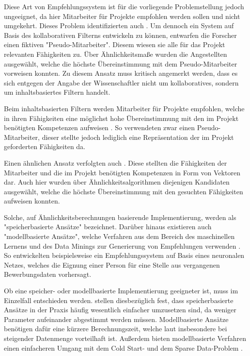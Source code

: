 \newpage
Diese Art von Empfehlungssystem ist für die vorliegende Problemstellung jedoch ungeeignet, da hier Mitarbeiter für Projekte empfohlen werden sollen und nicht umgekehrt. Dieses Problem identifizierten auch \textcite[S. 2]{mitre:2014}. Um dennoch ein System auf Basis des kollaborativen Filterns entwickeln zu können, entwarfen die Forscher einen fiktiven "Pseudo-Mitarbeiter". Diesem wiesen sie alle für das Projekt relevanten Fähigkeiten zu. Über Ähnlichkeitsmaße wurden die Angestellten ausgewählt, welche die höchste Übereinstimmung mit dem Pseudo-Mitarbeiter vorweisen konnten. Zu diesem Ansatz muss kritisch angemerkt werden, dass es sich entgegen der Angabe der Wissenschaftler nicht um kollaboratives, sondern um inhaltsbasiertes Filtern handelt.

Beim inhaltsbasierten Filtern werden Mitarbeiter für Projekte empfohlen, welche in ihren Fähigkeiten eine möglichst hohe Übereinstimmung mit den im Projekt benötigten Kompetenzen aufweisen \cite[S. 139]{recommenderSystems:2016}. So verwendeten \textcite[S. 2]{mitre:2014} zwar einen Pseudo-Mitarbeiter, dieser stellte jedoch lediglich eine Repräsentation der im Projekt geforderten Fähigkeiten da.

Einen ähnlichen Ansatz verfolgten auch \textcite[S. 6ff.]{buildingVectorRepresentations:2020}. Diese stellten die Fähigkeiten der Mitarbeiter und die im Projekt benötigten Kompetenzen in Form von Vektoren dar. Auch hier wurden über Ähnlichkeitsalgorithmen diejenigen Kandidaten ausgewählt, welche die höchste Übereinstimmung mit den gesuchten Fähigkeiten aufweisen konnten.

Solche, auf Ähnlichkeitsberechnungen basierende Implementierung, werden als "speicherbasierte Ansätze" bezeichnet. Darüber hinaus existieren auch "modellbasierte Ansätze", welche Verfahren aus dem Bereich des maschinellen Lernens und des Data Minings zur Generierung von Empfehlungen verwenden \cite[S. 9]{recommenderSystems:2016}. So entwickelten beispielsweise \textcite[S. 5ff.]{personJobFit:2018} ein Empfehlungssystem auf Basis eines neuronalen Netzes, welches die Eignung einer Person für eine Stelle aus vergangenen Bewerbungsdaten vorhersagt.

Ob eine speicher- oder modellbasierte Implementierung geeigneter ist, muss im Einzelfall entschieden werden. \textcite[S. 4]{peerToPeer:2008} stellen diesbezüglich fest, dass speicherbasierte Ansätze in der Praxis häufig wesentlich einfacher umzusetzen sind, da weniger Parameter aufeinander abgestimmt werden müssen. Modellbasierte Ansätze benötigen dafür eine kürzere Berechnungszeit, welche laut \textcite[S. 2]{weightedSimilarity:2015} insbesondere bei steigender Datenmenge vorteilhaft ist. Außerdem bieten modellbasierte Verfahren einen einfacheren Umgang mit dem Cold Start- und dem Sparse Data-Problem \cite[S. 4]{peerToPeer:2008}.


